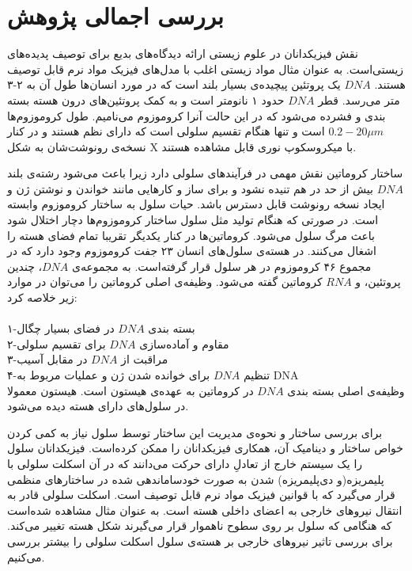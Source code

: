 \setRL
{} 
\section{بررسی اجمالی پژوهش}


نقش فیزیکدانان در علوم زیستی ارائه دیدگاه‌های بدیع برای توصیف پدیده‌های زیستی‌است. به عنوان مثال مواد زیستی اغلب با مدل‌های فیزیک مواد نرم قابل توصیف هستند. $DNA$ یک پروتئین پیچیده‌ی بسیار بلند است که در مورد انسان‌ها طول آن به ۲-۳ متر می‌رسد\cite{Kauffman:1999yu}. قطر $DNA$ حدود ۱ نانومتر است\cite{WATSON:1953fr} و به کمک پروتئین‌های درون هسته بسته بندی و فشرده می‌شود که در این حالت آنرا کروموزوم می‌نامیم. طول کروموزوم‌ها $0.2-20\mu m$ است و تنها هنگام تقسیم سلولی است که دارای نظم هستند و در کنار نسخه‌ی رونوشت‌شان به شکل X‌ با میکروسکوپ نوری قابل مشاهده هستند\cite{CHAFFEY:2003cr}. 

 ساختار کروماتین نقش مهمی در فرآیندهای سلولی دارد زیرا باعث می‌شود رشته‌ی بلند $DNA$ بیش از حد در هم تنیده نشود و برای ساز و کار‌هایی مانند خواندن و نوشتن ژن و ایجاد نسخه رونوشت قابل دسترس باشد\cite{PhysRevLett.120.088101, CHAFFEY:2003fv}. حیات سلول به ساختار کروموزوم وابسته است. در صورتی که هنگام تولید مثل سلول ساختار کروموزوم‌ها دچار اختلال شود باعث مرگ سلول می‌شود. 
 کروماتین‌ها در کنار یکدیگر تقریبا تمام فضای هسته را اشغال می‌کنند. در هسته‌ی سلول‌های انسان ۲۳ جفت کروموزوم وجود دارد که در مجموع ۴۶ کروموزوم در هر سلول قرار گرفته‌است.  به مجموعه‌ی $DNA$، چندین پروتئین، و $RNA$ کروماتین گفته می‌شود. وظیفه‌ی اصلی کروماتین را می‌توان در موارد زیر خلاصه کرد:\\\\
۱-بسته بندی $DNA$ در فضای بسیار چگال\\
۲-مقاوم و آماده‌سازی $DNA$ برای تقسیم سلولی\\
۳-مراقبت از $DNA$ در مقابل آسیب\\
۴-تنظیم $DNA$ برای خوانده شدن ژن و عملیات مربوط به DNA\\

وظیفه‌ی اصلی بسته بندی $DNA$ در کروماتین به عهده‌ی هیستون است\cite{Hammond:2017sp}. هیستون معمولا در سلول‌های دارای هسته دیده می‌شود.

 برای بررسی ساختار و نحوه‌ی مدیریت این ساختار توسط سلول نیاز به کمی کردن  خواص ساختار و دینامیک آن، همکاری فیزیکدانان را ممکن کرده‌است. فیزیکدانان سلول  را یک سیستم خارج از تعادلِ دارای حرکت
می‌دانند که در آن اسکلت سلولی با پلیمریزه(و دی‌پلیمریزه) شدن به صورت خودساماندهی‌ شده در ساختار‌های منظمی  قرار می‌گیرد که با قوانین فیزیک مواد نرم قابل توصیف است.\cite{Caballero:2015ty} اسکلت سلولی قادر به انتقال نیروهای خارجی به اعضای داخلی هسته است. به عنوان مثال مشاهده‌ شده‌است که هنگامی که سلول بر روی سطوح ناهموار قرار می‌گیرند شکل هسته تغییر می‌کند\cite{Heydari:2017cy}. برای بررسی تاثیر نیروهای خارجی بر هسته‌ی سلول اسکلت سلولی را بیشتر بررسی می‌کنیم.


